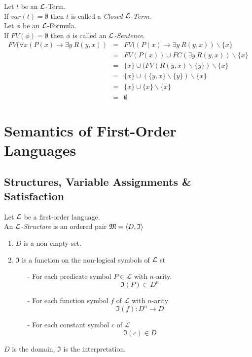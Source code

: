 \documentclass[11pt,a4paper]{article}
\begin{document}
Let $t$ be an $\mathcal{L}$-Term.\\
If $var(t)=\emptyset$ then $t$ is called a \textit{Closed $\mathcal{L}$-Term}.\\

Let $\phi$ be an $\mathcal{L}$-Formula.\\
If $FV(\phi)=\emptyset$ then $\phi$ is called an \textit{$\mathcal{L}$-Sentence}.\\

\[\begin{array}{rcl}
FV(\forall x(P(x)\to\exists y\ R(y,x))&=&FV((P(x)\to\exists y\ R(y,x))\backslash\{x\}\\
&=&FV(P(x))\cup FC(\exists y\ R(y,x))\backslash\{x\}\\
&=&\{x\}\cup(FV(R(y,x)\backslash\{y\})\backslash\{x\}\\
&=&\{x\}\cup(\{y,x\}\backslash\{y\})\backslash\{x\}\\
&=&\{x\}\cup\{x\}\backslash\{x\}\\
&=&\emptyset
\end{array}\]


\section{Semantics of First-Order Languages}

\subsection{Structures, Variable Assignments \& Satisfaction}

Let $\mathcal{L}$ be a first-order language.\\
An \textit{$\mathcal{L}$-Structure} is an ordered pair $\mathfrak{M}=\langle D,\mathfrak{I}\rangle$
\begin{enumerate}
	\item $D$ is a non-empty set.
	\item $\mathfrak{I}$ is a function on the non-logical symbols of $\mathcal{L}$ st
	\begin{itemize}
		\item[-] For each predicate symbol $P\in\mathcal{L}$ with $n$-arity.
		$$\mathfrak{I}(P)\subset D^n$$
		\item[-] For each function symbol $f$ of $\mathcal{L}$ with $n$-arity
		$$\mathfrak{I}(f):D^n\to D$$
		\item[-] For each constant symbol $c$ of $\mathcal{L}$
		$$\mathfrak{I}(c)\in D$$
	\end{itemize}
\end{enumerate}
\nb $D$ is the domain, $\mathfrak{I}$ is the interpretation.\\
\end{document}
